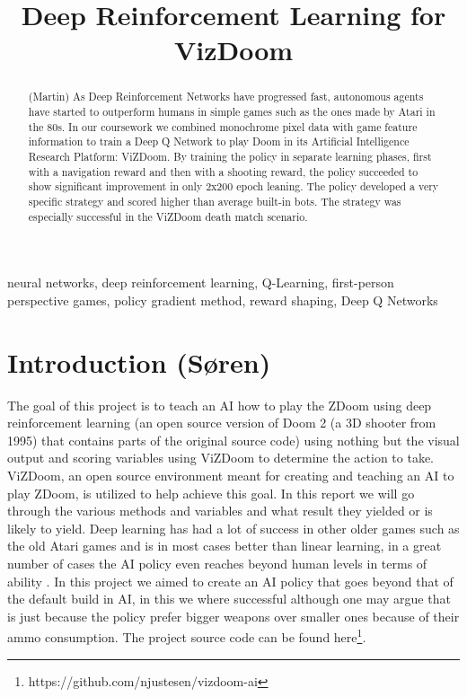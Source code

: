 \documentclass{article}
\title{Deep Reinforcement Learning for VizDoom}
\begin{document}
%

\maketitle
%
\begin{abstract}
(Martin)
As Deep Reinforcement Networks have progressed fast, autonomous agents have started to outperform humans in simple games such as the ones made by Atari in the 80s. In our coursework we combined monochrome pixel data with game feature information to train a Deep Q Network to play Doom in its Artificial Intelligence Research Platform: ViZDoom. By training the policy in separate learning phases, first with a navigation reward and then with a shooting reward, the policy succeeded to show significant improvement in only 2x200 epoch leaning. The policy developed a very specific strategy and scored higher than average built-in bots. The strategy was especially successful in the ViZDoom death match scenario.

\end{abstract}
%
\begin{keywords}
neural networks, deep reinforcement learning, Q-Learning, first-person perspective games, policy gradient method, reward shaping, Deep Q Networks
\end{keywords}

\section{Introduction (Søren)}
\label{sec:intro}
The goal of this project is to teach an AI how to play the ZDoom using deep reinforcement learning (an open source version of Doom 2 (a 3D shooter from 1995) that contains parts of the original source code) using nothing but the visual output and scoring variables using ViZDoom to determine the action to take.
ViZDoom, an open source environment meant for creating and teaching an AI to play ZDoom, is utilized to help achieve this goal. In this report we will go through the various methods and variables and what result they yielded or is likely to yield.
Deep learning has had a lot of success in other older games such as the old Atari games\cite{mnih2015human} and is in most cases better than linear learning, in a great number of cases the AI policy even reaches beyond human levels in terms of ability \cite{silver2016mastering}. In this project we aimed to create an AI policy that goes beyond that of the default build in AI, in this we where successful although one may argue that is just because the policy prefer bigger weapons over smaller ones because of their ammo consumption. The project source code can be found here\footnote{https://github.com/njustesen/vizdoom-ai}.
\end{document}
